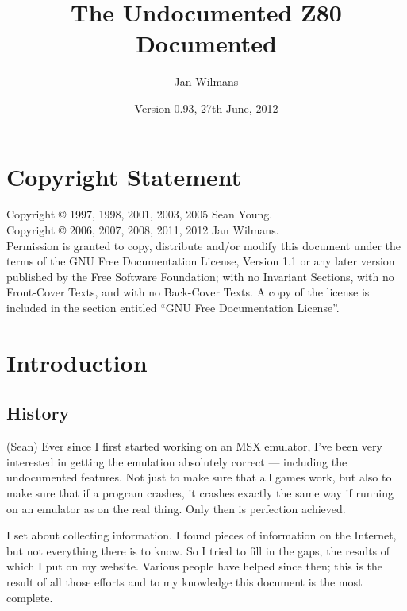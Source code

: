 \documentclass[oneside,a4paper]{book}
\begin{document}

\title{The Undocumented Z80 Documented}
\author{Jan Wilmans}
\date{Version 0.93, 27th June, 2012}

\maketitle

\frontmatter

\chapter*{Copyright Statement}

      Copyright {\copyright} 1997, 1998, 2001, 2003, 2005 Sean Young.\\
      Copyright {\copyright} 2006, 2007, 2008, 2011, 2012 Jan Wilmans.\\
	
      Permission is granted to copy, distribute and/or modify this document
      under the terms of the GNU Free Documentation License, Version 1.1
      or any later version published by the Free Software Foundation;
      with no Invariant Sections, with no Front-Cover Texts, and with no 
      Back-Cover Texts. A copy of the license is included in the section 
      entitled ``GNU Free Documentation License''.

\tableofcontents

\mainmatter

\setcounter{page}{5}
\chapter{Introduction}

\section{History}

(Sean)
Ever since I first started working on an MSX emulator, I've been very 
interested in getting the emulation absolutely correct --- including the 
undocumented features. Not just to make sure that all games work, but 
also to make sure that if a program crashes, it crashes exactly the same 
way if running on an emulator as on the real thing. Only then is perfection 
achieved.

I set about collecting information. I found pieces of information on the
Internet, but not everything there is to know. So I tried to fill in the
gaps, the results of which I put on my website. Various people have helped
since then; this is the result of all those efforts and to my knowledge 
this document is the most complete.\\\\
\end{document}
